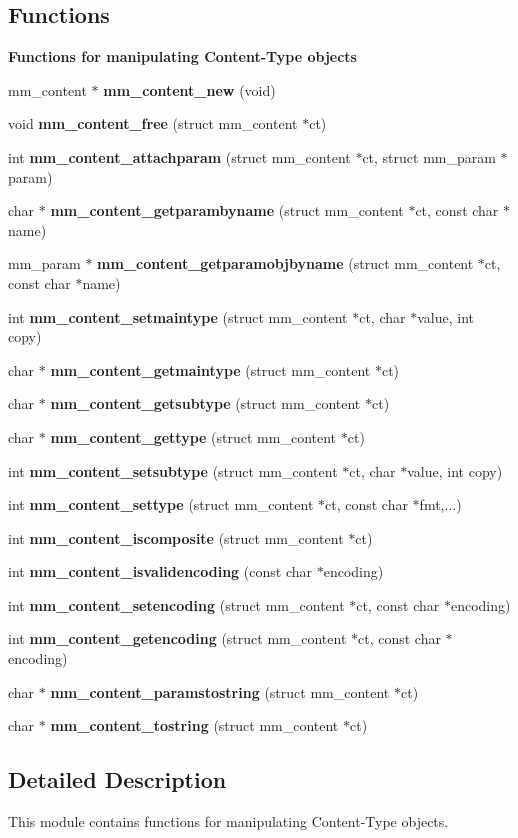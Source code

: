 \subsection*{Functions}
\begin{Indent}{\bf Functions for manipulating Content-Type objects}\par
\begin{CompactItemize}
\item 
mm\_\-content $\ast$ {\bf mm\_\-content\_\-new} (void)
\item 
void {\bf mm\_\-content\_\-free} (struct mm\_\-content $\ast$ct)
\item 
int {\bf mm\_\-content\_\-attachparam} (struct mm\_\-content $\ast$ct, struct mm\_\-param $\ast$param)
\item 
char $\ast$ {\bf mm\_\-content\_\-getparambyname} (struct mm\_\-content $\ast$ct, const char $\ast$name)
\item 
mm\_\-param $\ast$ \textbf{mm\_\-content\_\-getparamobjbyname} (struct mm\_\-content $\ast$ct, const char $\ast$name)\label{group__contenttype_g1ba63e679d2b49aceb6cfec8a6752581}

\item 
int {\bf mm\_\-content\_\-setmaintype} (struct mm\_\-content $\ast$ct, char $\ast$value, int copy)
\item 
char $\ast$ {\bf mm\_\-content\_\-getmaintype} (struct mm\_\-content $\ast$ct)
\item 
char $\ast$ {\bf mm\_\-content\_\-getsubtype} (struct mm\_\-content $\ast$ct)
\item 
char $\ast$ \textbf{mm\_\-content\_\-gettype} (struct mm\_\-content $\ast$ct)\label{group__contenttype_ga6d8453eb35bd695c4944e53b7040b65}

\item 
int {\bf mm\_\-content\_\-setsubtype} (struct mm\_\-content $\ast$ct, char $\ast$value, int copy)
\item 
int \textbf{mm\_\-content\_\-settype} (struct mm\_\-content $\ast$ct, const char $\ast$fmt,...)\label{group__contenttype_g878686678ea2ba97aa8edb1206a564d8}

\item 
int {\bf mm\_\-content\_\-iscomposite} (struct mm\_\-content $\ast$ct)
\item 
int {\bf mm\_\-content\_\-isvalidencoding} (const char $\ast$encoding)
\item 
int {\bf mm\_\-content\_\-setencoding} (struct mm\_\-content $\ast$ct, const char $\ast$encoding)
\item 
int {\bf mm\_\-content\_\-getencoding} (struct mm\_\-content $\ast$ct, const char $\ast$encoding)
\item 
char $\ast$ {\bf mm\_\-content\_\-paramstostring} (struct mm\_\-content $\ast$ct)
\item 
char $\ast$ {\bf mm\_\-content\_\-tostring} (struct mm\_\-content $\ast$ct)
\end{CompactItemize}
\end{Indent}


\subsection{Detailed Description}
This module contains functions for manipulating Content-Type objects. 